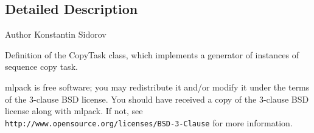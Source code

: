 \subsection{Detailed Description}
\begin{DoxyAuthor}{Author}
Konstantin Sidorov
\end{DoxyAuthor}
Definition of the Copy\+Task class, which implements a generator of instances of sequence copy task.

mlpack is free software; you may redistribute it and/or modify it under the terms of the 3-\/clause B\+SD license. You should have received a copy of the 3-\/clause B\+SD license along with mlpack. If not, see {\tt http\+://www.\+opensource.\+org/licenses/\+B\+S\+D-\/3-\/\+Clause} for more information. 